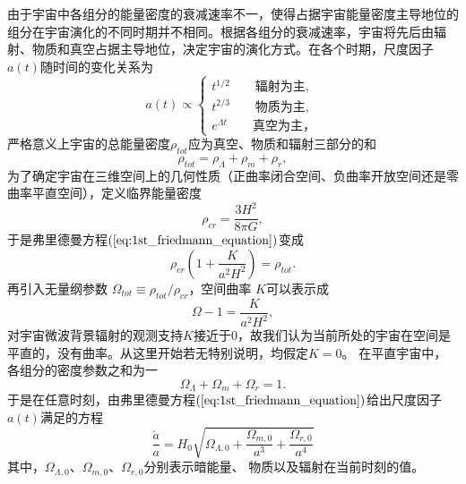 由于宇宙中各组分的能量密度的衰减速率不一，使得占据宇宙能量密度主导地位的组分在宇宙演化的不同时期并不相同。根据各组分的衰减速率，宇宙将先后由辐射、物质和真空占据主导地位，决定宇宙的演化方式。在各个时期，尺度因子$a(t)$随时间的变化关系为
\begin{equation}
    a(t)\propto 
    \begin{cases}
        t^{1/2}\qquad \text{辐射为主},\\
        t^{2/3}\qquad \text{物质为主},\\
        e^{\Lambda t}\qquad \text{真空为主，}
    \end{cases}
\end{equation}
严格意义上宇宙的总能量密度$\rho_{tot}$应为真空、物质和辐射三部分的和
\begin{equation}
    \rho_{tot} = \rho_{\Lambda}+\rho_m+\rho_r,
\end{equation}
为了确定宇宙在三维空间上的几何性质（正曲率闭合空间、负曲率开放空间还是零曲率平直空间），定义临界能量密度 
\begin{equation}
    \label{eq:critical_rho}
    \rho_{cr} = \frac{3H^2}{8\pi G},
\end{equation}
于是弗里德曼方程$(\ref{eq:1st_friedmann_equation})$变成
\begin{equation}
    \rho_{cr}\left(1 + \frac{K}{a^2H^2}\right) = \rho_{tot}.
\end{equation}
再引入无量纲参数 $\Omega_{tot}\equiv
\rho_{tot}/\rho_{cr}$，空间曲率 $K$可以表示成
\begin{equation}\label{eq:flatness}
    \Omega - 1 = \frac{K}{a^2H^2} ,
\end{equation}
对宇宙微波背景辐射的观测支持$K$接近于$0$，故我们认为当前所处的宇宙在空间是平直的，没有曲率。从这里开始若无特别说明，均假定$K=0$。
在平直宇宙中，各组分的密度参数之和为一
\begin{equation}
    \Omega_{\Lambda}+\Omega_m+\Omega_r=1.
\end{equation}
于是在任意时刻，由弗里德曼方程$(\ref{eq:1st_friedmann_equation})$给出尺度因子$a(t)$满足的方程
\begin{equation}
    \frac{\dot{a}}{a} =
    H_0\sqrt{\Omega_{\Lambda,0}+\frac{\Omega_{m,0}}{a^3}+\frac{\Omega_{r,0}}{a^4}}
\end{equation}
其中，$\Omega_{\Lambda,0}$、$\Omega_{m,0}$、$\Omega_{r,0}$分别表示暗能量、
物质以及辐射在当前时刻的值。
